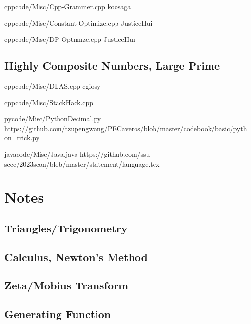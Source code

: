 \documentclass[landscape, 8pt, a4paper, oneside]{extarticle}
\begin{document}
\begin{multicols*}{3}

{}{}
{cpp}{code/Misc/Cpp-Grammer.cpp}
{koosaga}

{}{}
{cpp}{code/Misc/Constant-Optimize.cpp}
{JusticeHui}

{}{}
{cpp}{code/Misc/DP-Optimize.cpp}
{JusticeHui}

\subsection{Highly Composite Numbers, Large Prime} %


{}{}
{cpp}{code/Misc/DLAS.cpp}
{cgiosy}

{}{}
{cpp}{code/Misc/StackHack.cpp}
{}

{}{}
{py}{code/Misc/PythonDecimal.py}
{https://github.com/tzupengwang/PECaveros/blob/master/codebook/basic/python_trick.py}

{}{}
{java}{code/Misc/Java.java}
{https://github.com/ssu-sccc/2023scon/blob/master/statement/language.tex}

\section{Notes}

\subsection{Triangles/Trigonometry} %


\subsection{Calculus, Newton's Method}


\subsection{Zeta/Mobius Transform}


\subsection{Generating Function}



\end{multicols*}
\end{document}
